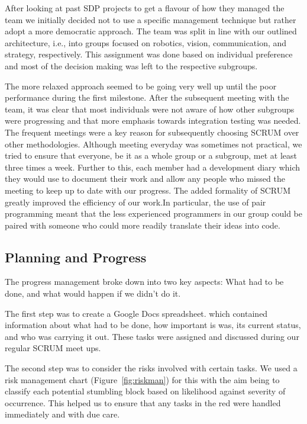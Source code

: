 \documentclass[12pt,a4paper,notitlepage,twocolumn]{report}
\begin{document}
After looking at past SDP projects to get a flavour of how they
managed the team we initially decided not to use a specific management
technique but rather adopt a more democratic approach. The team was
split in line with our outlined architecture, i.e., into groups
focused on robotics, vision, communication, and strategy,
respectively. This assignment was done based on individual preference
and most of the decision making was left to the respective subgroups.

 The more relaxed approach seemed to be going very well up until the
poor performance during the first milestone. After the subsequent
meeting with the team, it was clear that most individuals were not
aware of how other subgroups were progressing and that more emphasis
towards integration testing was needed. The frequent meetings were a
key reason for subsequently choosing SCRUM over other methodologies.
Although meeting everyday was sometimes not practical, we tried to
ensure that everyone, be it as a whole group or a subgroup, met at
least three times a week. Further to this, each member had a
development diary which they would use to document their work and
allow any people who missed the meeting to keep up to date with our
progress. The added formality of SCRUM greatly improved the efficiency
of our work.In particular, the use of pair programming meant that the
less experienced programmers in our group could be paired with someone
who could more readily translate their ideas into code.

\subsection*{Planning and Progress}
The progress management broke down into two key aspects: What had to
be done, and what would happen if we didn't do it.

The first step was to create a Google Docs spreadsheet. which
contained information about what had to be done, how important is was,
its current status, and who was carrying it out. These tasks were
assigned and discussed during our regular SCRUM meet ups.

The second step was to consider the risks involved with certain tasks.
We used a risk management chart (Figure~\ref{fig:riskman}) for this with the
aim being to classify each potential stumbling block based on
likelihood against severity of occurrence. This helped us to ensure
that any tasks in the red were handled immediately and with due care.

\end{document}
